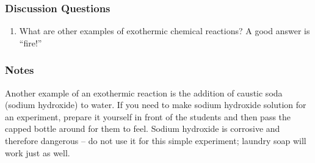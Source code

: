 \subsubsection*{Discussion Questions}
\begin{enumerate}
\item{What are other examples of exothermic chemical reactions? A good answer is ``fire!''}
\end{enumerate}

\subsubsection*{Notes}
Another example of an exothermic reaction is the addition of caustic soda (sodium hydroxide) to water. If you need to make sodium hydroxide solution for an experiment, prepare it yourself in front of the students and then pass the capped bottle around for them to feel. Sodium hydroxide is corrosive and therefore dangerous -- do not use it for this simple experiment; laundry soap will work just as well.